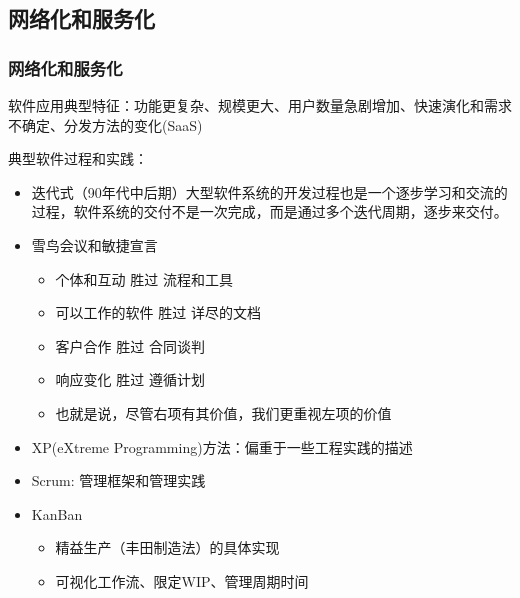 \subsection{网络化和服务化}
\subsubsection{网络化和服务化}
软件应用典型特征：功能更复杂、规模更大、用户数量急剧增加、快速演化和需求不确定、分发方法的变化(SaaS)

典型软件过程和实践：
\begin{itemize}
    \item 迭代式（90年代中后期）大型软件系统的开发过程也是一个逐步学习和交流的过程，软件系统的交付不是一次完成，而是通过多个迭代周期，逐步来交付。
    \item 雪鸟会议和敏捷宣言
    \vspace{-0.8em}
    \begin{multicols}{2}
        \begin{itemize}
            \item 个体和互动 胜过 流程和工具
            \item 可以工作的软件 胜过 详尽的文档
            \item 客户合作 胜过 合同谈判
            \item 响应变化 胜过 遵循计划
        \end{itemize}
    \end{multicols}
    \vspace{-1em}
    \vspace{-0.4em}
    \begin{itemize}
        \item 也就是说，尽管右项有其价值，我们更重视左项的价值
    \end{itemize}
    \item XP(eXtreme Programming)方法：偏重于一些工程实践的描述
    \item Scrum: 管理框架和管理实践
    \item KanBan
    \vspace{-0.8em}
    \begin{multicols}{2}
        \begin{itemize}
            \item 精益生产（丰田制造法）的具体实现
            \item 可视化工作流、限定WIP、管理周期时间
        \end{itemize}
    \end{multicols}
    \vspace{-1em}

\end{itemize}

